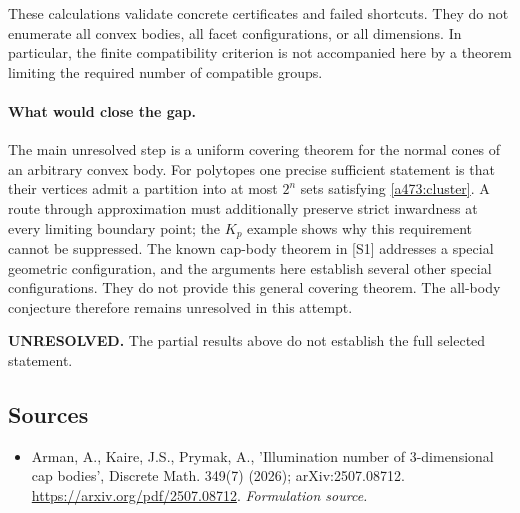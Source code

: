 \documentclass[11pt]{article}
\begin{document}
These calculations validate concrete certificates and failed shortcuts. They do not enumerate all convex bodies, all facet configurations, or all dimensions. In particular, the finite compatibility criterion is not accompanied here by a theorem limiting the required number of compatible groups.

\paragraph{What would close the gap.}
The main unresolved step is a uniform covering theorem for the normal cones of an arbitrary convex body. For polytopes one precise sufficient statement is that their vertices admit a partition into at most $2^n$ sets satisfying \eqref{a473:cluster}. A route through approximation must additionally preserve strict inwardness at every limiting boundary point; the $K_p$ example shows why this requirement cannot be suppressed. The known cap-body theorem in [S1] addresses a special geometric configuration, and the arguments here establish several other special configurations. They do not provide this general covering theorem. The all-body conjecture therefore remains unresolved in this attempt.

\textbf{UNRESOLVED.} The partial results above do not establish the full selected statement.

\subsection{Sources}
\begin{itemize}
\item[S1]Arman, A., Kaire, J.S., Prymak, A., 'Illumination number of 3-dimensional cap bodies', Discrete Math. 349(7) (2026); arXiv:2507.08712.
\url{https://arxiv.org/pdf/2507.08712}.
\textit{Formulation source.}
\end{itemize}
\end{document}
